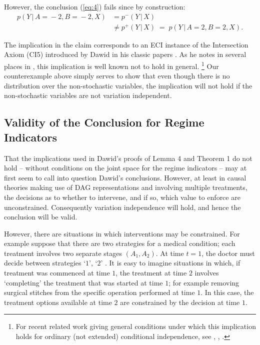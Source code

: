 \documentclass[11pt]{article}
\begin{document}
{However, the conclusion (\ref{eq:4}) fails since by construction:
\begin{align}
p(Y \,|\, A\!=\!-2,B\!=\!-2, X) &= p^-(Y\,|\, X)\nonumber \\
 &\neq p^+(Y\,|\, X) \;=\; p(Y \,|\, A\!=\!2,B\!=\!2, X).
\end{align}
 
The implication in the claim corresponds to an ECI instance of the Intersection Axiom (CI5) introduced by Dawid in his classic papers \citep{dawid:1979,dawid:1980}. As he notes in several places in \citep{dawid:2021}, this implication is well known not to hold in general.%
\footnote{For recent related work giving general conditions under which this implication holds for ordinary (not extended) conditional independence, 
see \citet{gill:2019}, \citet[Ch.4]{sullivant:2018}, \citet{peters:intersection}.} Our counterexample above simply serves to show that even though there is no distribution over the non-stochastic variables, the implication will not hold if the non-stochastic variables are not variation independent.

\subsection{Validity of the Conclusion for Regime Indicators}

That the implications used in Dawid's proofs of Lemma 4 and Theorem 1 do not hold  -- without conditions on the joint space for the regime indicators --  may at first seem to call into question Dawid's conclusions.  However, at least in causal theories making use of DAG representations and involving multiple treatments, the decisions as to whether to intervene, and if so, which value to enforce are unconstrained. Consequently variation independence will hold, and hence the conclusion will be valid.

However, there are situations in which interventions may be constrained. For example suppose that there are two strategies for a medical condition;  each treatment involves two separate stages $(A_1,A_2)$. At time $t=1$, the doctor must decide between strategies `$1$', `$2$' .
It is easy to imagine situations in which, if treatment was commenced at time $1$,  the treatment at time $2$ involves `completing' the treatment that was started at time $1$; for example removing surgical stitches from the specific operation performed at time $1$.
In this case, the treatment options available at time $2$ are constrained by the decision at time $1$.

}
\end{document}
